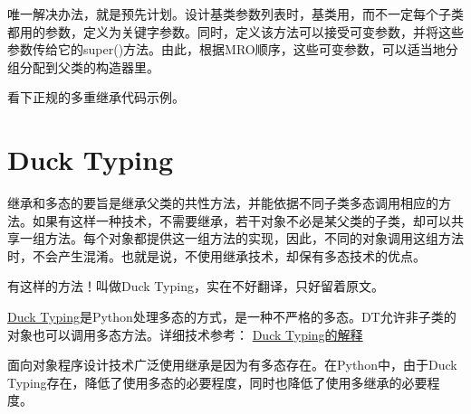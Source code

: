 \begin{python}
唯一解决办法，就是预先计划。设计基类参数列表时，基类用，而不一定每个子类都用的参数，定义为关键字参数。同时，定义该方法可以接受可变参数，并将这些参数传给它的super()方法。由此，根据MRO顺序，这些可变参数，可以适当地分组分配到父类的构造器里。
  
看下正规的多重继承代码示例。

\section{Duck Typing}
继承和多态的要旨是继承父类的共性方法，并能依据不同子类多态调用相应的方法。如果有这样一种技术，不需要继承，若干对象不必是某父类的子类，却可以共享一组方法。每个对象都提供这一组方法的实现，因此，不同的对象调用这组方法时，不会产生混淆。也就是说，不使用继承技术，却保有多态技术的优点。

有这样的方法！叫做Duck Typing，实在不好翻译，只好留着原文。

\href{http://en.wikipedia.org/wiki/Duck_typing}{Duck Typing}是Python处理多态的方式，是一种不严格的多态。DT允许非子类的对象也可以调用多态方法。详细技术参考：
\href{http://www.voidspace.org.uk/python/articles/duck_typing.shtlm}{Duck Typing的解释}








面向对象程序设计技术广泛使用继承是因为有多态存在。在Python中，由于Duck Typing存在，降低了使用多态的必要程度，同时也降低了使用多继承的必要程度。


\end{python}
